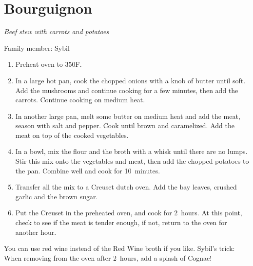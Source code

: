 \chapter{Bourguignon}
\label{ch:bourguignon}



\textit{Beef stew with carrots and potatoes}

Family member: Sybil

\begin{enumerate}
    \item Preheat oven to 350\degree F.
    \item In a large hot pan, cook the chopped onions with a knob of butter until soft. Add the mushrooms and continue cooking for a few minutes, then add the carrots. Continue cooking on medium heat.
    \item In another large pan, melt some butter on medium heat and add the meat, season with salt and pepper. Cook until brown and caramelized. Add the meat on top of the cooked vegetables.
    \item In a bowl, mix the flour and the broth with a whisk until there are no lumps. Stir this mix onto the vegetables and meat, then add the chopped potatoes to the pan. Combine well and cook for 10~minutes.
    \item Transfer all the mix to a Creuset dutch oven. Add the bay leaves, crushed garlic and the brown sugar.
    \item Put the Creuset in the preheated oven, and cook for 2~hours. At this point, check to see if the meat is tender enough, if not, return to the oven for another hour.
\end{enumerate}

You can use red wine instead of the Red Wine broth if you like. Sybil's trick: When removing from the oven after 2~hours, add a splash of Cognac!
